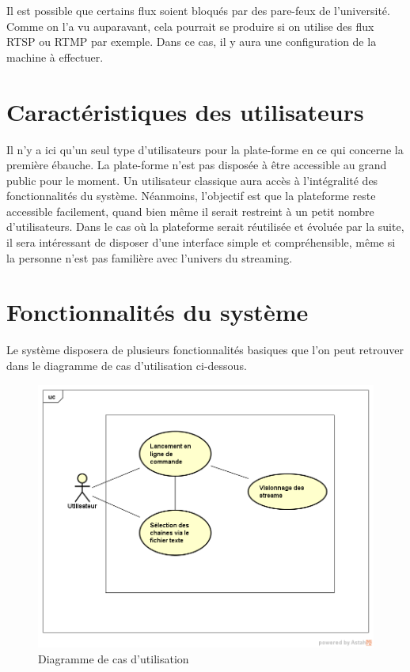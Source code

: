 \documentclass{polytech/polytech}
\begin{document}
Il est possible que certains flux soient bloqués par des pare-feux de l’université. Comme on l’a vu auparavant, cela pourrait se produire si on utilise des flux RTSP ou RTMP par exemple. Dans ce cas, il y aura une configuration de la machine à effectuer.

\section{Caractéristiques des utilisateurs}


Il n’y a ici qu’un seul type d’utilisateurs pour la plate-forme en ce qui concerne la première ébauche. La plate-forme n’est pas disposée à être accessible au grand public pour le moment. Un utilisateur classique aura accès à l’intégralité des fonctionnalités du système. Néanmoins, l’objectif est que la plateforme reste accessible facilement, quand bien même il serait restreint à un petit nombre d’utilisateurs. Dans le cas où la plateforme serait réutilisée et évoluée par la suite, il sera intéressant de disposer d’une interface simple et compréhensible, même si la personne n’est pas familière avec l’univers du streaming.

\section{Fonctionnalités du système}

Le système disposera de plusieurs fonctionnalités basiques que l’on peut retrouver dans le
diagramme de cas d’utilisation ci-dessous.

\begin{figure}
	\includegraphics[scale=0.75]{images/UseCase2}
	\caption{Diagramme de cas d'utilisation}
	\label{fig:diagUseCase}
\end{figure}
\end{document}
